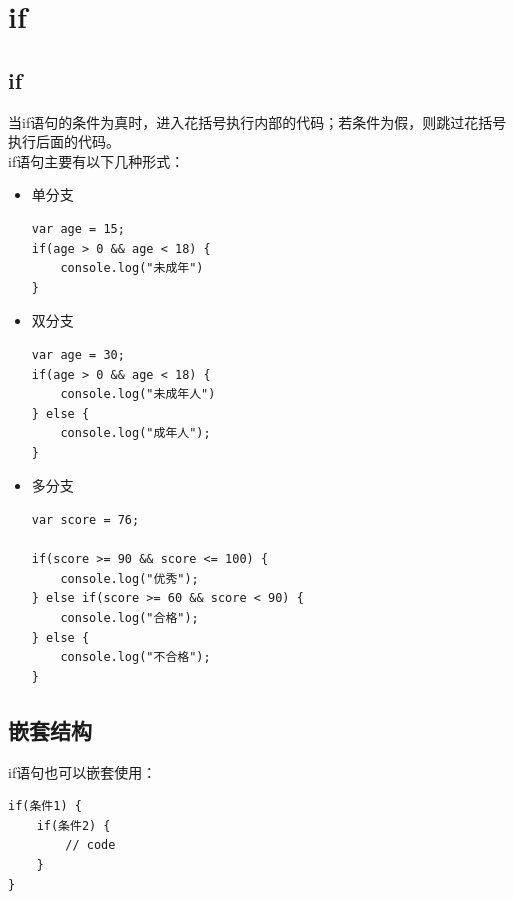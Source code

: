 \newpage

\section{if}

\subsection{if}

当if语句的条件为真时，进入花括号执行内部的代码；若条件为假，则跳过花括号执行后面的代码。 \\

if语句主要有以下几种形式：

\begin{itemize}
	\item 单分支 \\
	      \begin{lstlisting}[style=htmlcssjs]
var age = 15;
if(age > 0 && age < 18) {
    console.log("未成年")
}
        \end{lstlisting}

	\item 双分支 \\
	      \begin{lstlisting}[style=htmlcssjs]
var age = 30;
if(age > 0 && age < 18) {
    console.log("未成年人")
} else {
    console.log("成年人");
}
\end{lstlisting}

	\item 多分支 \\
	      \begin{lstlisting}[style=htmlcssjs]
var score = 76;

if(score >= 90 && score <= 100) {
    console.log("优秀");
} else if(score >= 60 && score < 90) {
    console.log("合格");
} else {
    console.log("不合格");
}
        \end{lstlisting}
\end{itemize}

\subsection{嵌套结构}

if语句也可以嵌套使用： \\

\begin{lstlisting}[style=htmlcssjs]
if(条件1) {
    if(条件2) {
        // code
    }
}
\end{lstlisting}

